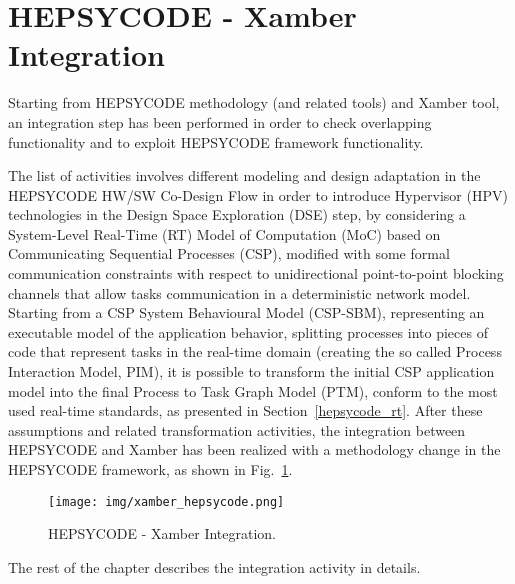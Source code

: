 \section{HEPSYCODE - Xamber Integration}
%
Starting from HEPSYCODE methodology (and related tools) and Xamber tool, an integration step has been performed in order to check overlapping functionality and to exploit HEPSYCODE framework functionality. \par
The list of activities involves different modeling and design adaptation in the HEPSYCODE HW/SW Co-Design Flow in order to introduce Hypervisor (HPV) technologies in the Design Space Exploration (DSE) step, by considering a System-Level Real-Time (RT) Model of Computation (MoC) based on Communicating Sequential Processes (CSP), modified with some formal communication constraints with respect to unidirectional point-to-point blocking channels that allow tasks communication in a deterministic network model. 
Starting from a CSP System Behavioural Model (CSP-SBM), representing an executable model of the application behavior, splitting processes into pieces of code that represent tasks in the real-time domain (creating the so called Process Interaction Model, PIM), it is possible to transform the initial CSP application model into the final Process to Task Graph Model (PTM), conform to the most used real-time standards, as presented in Section~\ref{hepsycode_rt}. After these assumptions and related transformation activities, the integration between HEPSYCODE and Xamber has been realized with a methodology change in the HEPSYCODE framework, as shown in Fig.~\ref{xamber_hepcysode_01}. \par
%
\begin{figure}[htbp]
	\centerline{\texttt{[image: img/xamber\_hepsycode.png]}}
	\caption{HEPSYCODE - Xamber Integration.}
	\label{xamber_hepcysode_01}
\end{figure}
%
The rest of the chapter describes the integration activity in details.
%
